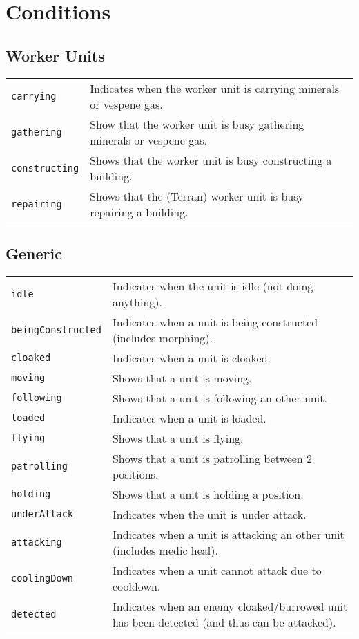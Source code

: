 \newpage
\section{Conditions}
\label{conditions}

\subsection{Worker Units}
\begin{tabularx}{\textwidth}{lX}
 \verb|carrying| & Indicates when the worker unit is carrying minerals or vespene gas. \\
 \verb|gathering| & Show that the worker unit is busy gathering minerals or vespene gas. \\
 \verb|constructing| & Shows that the worker unit is busy constructing a building. \\
 \verb|repairing| & Shows that the (Terran) worker unit is busy repairing a building.
\end{tabularx}

\subsection{Generic}
\begin{tabularx}{\textwidth}{lX}
 \verb|idle| & Indicates when the unit is idle (not doing anything).\\
 \verb|beingConstructed| & Indicates when a unit is being constructed (includes morphing). \\
 \verb|cloaked| & Indicates when a unit is cloaked.\\
 \verb|moving| & Shows that a unit is moving.\\
 \verb|following| & Shows that a unit is following an other unit.\\
 \verb|loaded| & Indicates when a unit is loaded.\\
 \verb|flying| & Shows that a unit is flying.\\
 \verb|patrolling| & Shows that a unit is patrolling between 2 positions.\\
 \verb|holding| & Shows that a unit is holding a position.\\
 \verb|underAttack| & Indicates when the unit is under attack.\\
 \verb|attacking| & Indicates when a unit is attacking an other unit (includes medic heal).\\
 \verb|coolingDown| & Indicates when a unit cannot attack due to cooldown.\\
  \verb|detected| & Indicates when an enemy cloaked/burrowed unit has been detected (and thus can be attacked).
\end{tabularx}

